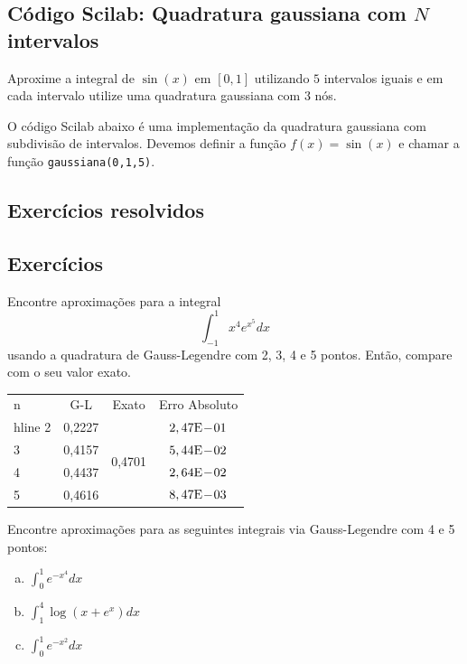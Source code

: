 \ifisscilab
\subsection{Código Scilab: Quadratura gaussiana com $N$ intervalos}
\begin{ex}
Aproxime a integral de $\sin(x)$ em $[0,1]$ utilizando $5$ intervalos iguais e em cada intervalo utilize uma quadratura gaussiana com $3$ nós.
\end{ex}

O código Scilab abaixo é uma implementação da quadratura gaussiana com subdivisão de intervalos. Devemos definir a função $f(x)=\sin(x)$ e chamar a função \verb#gaussiana(0,1,5)#.


\fi


\subsection*{Exercícios resolvidos}

\construirExeresol

\subsection*{Exercícios}

\begin{exer}Encontre aproximações para a integral
\begin{equation} \int_{-1}^1 x^4e^{x^5}dx \end{equation}
usando a quadratura de Gauss-Legendre com 2, 3, 4 e 5 pontos. Então, compare com o seu valor exato.
\end{exer}
\begin{resp}
  \begin{center}
    \begin{tabular}{l|ccc}
      n& G-L& Exato& Erro Absoluto\\hline
      2& 0,2227 & \multirow{4}{*}{0,4701} & $2,47\mathrm{E}\!-\!01$\\
      3& 0,4157 & & $5,44\mathrm{E}\!-\!02$\\
      4& 0,4437 & & $2,64\mathrm{E}\!-\!02$\\
      5& 0,4616 & & $8,47\mathrm{E}\!-\!03$
    \end{tabular}
  \end{center}
\end{resp}

\begin{exer} Encontre aproximações para as seguintes integrais via Gauss-Legendre com 4 e 5 pontos:
\begin{enumerate}[a)]
\item $\displaystyle \int_0^1 e^{-x^4}dx$
\item $\displaystyle \int_1^4 \log(x+e^x)dx$
\item $\displaystyle \int_0^1 e^{-x^2}dx$
\end{enumerate}
\end{exer}

